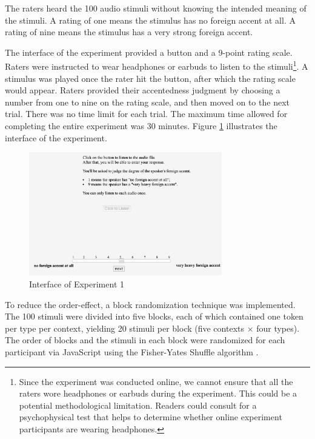 The raters heard the 100 audio stimuli without knowing the intended meaning of the stimuli. A rating of one means the stimulus has no foreign accent at all. A rating of nine means the stimulus has a very strong foreign accent.

The interface of the experiment provided a button and a 9-point rating scale. Raters were instructed to wear headphones or earbuds to listen to the stimuli\footnote{Since the experiment was conducted online, we cannot ensure that all the raters wore headphones or earbuds during the experiment. This could be a potential methodological limitation. Readers could consult \citet{Woods_2017} for a psychophysical test that helps to determine whether online experiment participants are wearing headphones.}. A stimulus was played once the rater hit the button, after which the rating scale would appear. Raters provided their accentedness judgment by choosing a number from one to nine on the rating scale, and then moved on to the next trial. There was no time limit for each trial. The maximum time allowed for completing the entire experiment was 30 minutes. Figure \ref{fig:exp1} illustrates the interface of the experiment.

\begin{figure}[!h]
  \figSpace
    \centering
	\includegraphics[width=0.75\textwidth]{figures/exp1.jpg}
    \caption{Interface of Experiment 1}
    \label{fig:exp1}
  \figSpace
\end{figure}

To reduce the order-effect, a block randomization technique was implemented. The 100 stimuli were divided into five blocks, each of which contained one token per type per context, yielding 20 stimuli per block (five contexts × four types). The order of blocks and the stimuli in each block were randomized for each participant via JavaScript using the Fisher-Yates Shuffle algorithm \citep{Fisher_1963}. 

